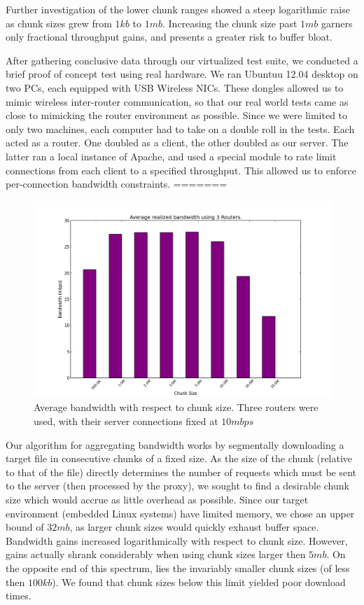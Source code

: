 \documentclass[12pt]{article}
\begin{document}
		Further investigation of the lower chunk ranges showed a steep logarithmic raise as chunk sizes grew from $1 kb$ to $1 mb$. Increasing the chunk size past $1 mb$ garners only fractional throughput gains, and presents a greater risk to buffer bloat. 

	After gathering conclusive data through our virtualized test suite, we conducted a brief proof of concept test using real hardware. We ran Ubuntuu 12.04 desktop on two PCs, each equipped with USB Wireless NICs. These dongles allowed us to mimic wireless inter-router communication, so that our real world tests came as close to mimicking the router environment as possible. Since we were limited to only two machines, each computer had to take on a double roll in the tests. Each acted as a router. One doubled as a client, the other doubled as our server. The latter ran a local instance of Apache, and used a special module to rate limit connections from each client to a specified throughput. This allowed us to enforce per-connection bandwidth constraints. 
=======

		\begin{figure}[H]
			\centering
			\includegraphics[keepaspectratio=true,scale=0.5]{chunk_rate_3R.png}
			\caption{Average bandwidth with respect to chunk size. Three routers were used, with their server connections fixed at $10 mbps$}
		\end{figure}

		Our algorithm for aggregating bandwidth works by segmentally downloading a target file in consecutive chunks of a fixed size. As the size of the chunk (relative to that of the file) directly determines the number of requests which must be sent to the server (then processed by the proxy), we sought to find a desirable chunk size which would accrue as little overhead as possible. Since our target environment (embedded Linux systems) have limited memory, we chose an upper bound of $32 mb$, as larger chunk sizes would quickly exhaust buffer space. Bandwidth gains increased logarithmically with respect to chunk size. However, gains actually shrank considerably when using chunk sizes larger then $5 mb$. On the opposite end of this spectrum, lies the invariably smaller chunk sizes (of less then $100 kb$). We found that chunk sizes below this limit yielded poor download times. 
\end{document}
